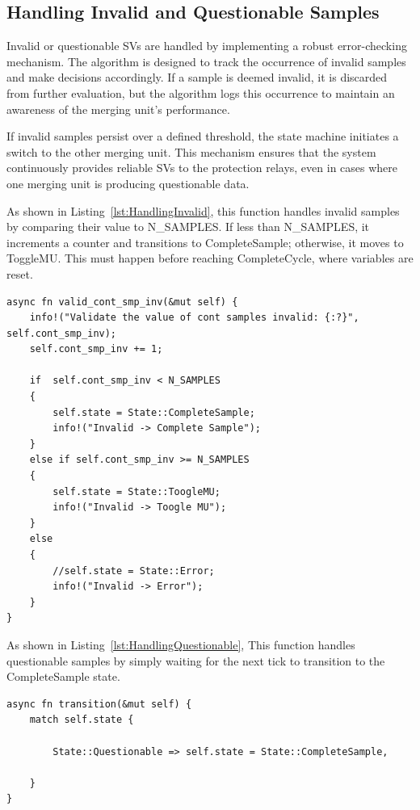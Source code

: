 \pagebreak

\subsection{Handling Invalid and Questionable Samples}
Invalid or questionable SVs are handled by implementing a robust error-checking mechanism. The algorithm is designed to track the occurrence of invalid samples and make decisions accordingly. If a sample is deemed invalid, it is discarded from further evaluation, but the algorithm logs this occurrence to maintain an awareness of the merging unit's performance.

If invalid samples persist over a defined threshold, the state machine initiates a switch to the other merging unit. This mechanism ensures that the system continuously provides reliable SVs to the protection relays, even in cases where one merging unit is producing questionable data.

As shown in Listing~\ref{lst:HandlingInvalid}, this function handles invalid samples by comparing their value to N\_SAMPLES. If less than N\_SAMPLES, it increments a counter and transitions to CompleteSample; otherwise, it moves to ToggleMU. This must happen before reaching CompleteCycle, where variables are reset.

\begin{lstlisting}[breaklines=true, caption={Function \texttt{valid\_cont\_smp\_inv()} changes state based on the frequency of invalid samples.}, label={lst:HandlingInvalid}]
async fn valid_cont_smp_inv(&mut self) {
	info!("Validate the value of cont samples invalid: {:?}", self.cont_smp_inv);
	self.cont_smp_inv += 1;
	
	if  self.cont_smp_inv < N_SAMPLES
	{
		self.state = State::CompleteSample;
		info!("Invalid -> Complete Sample");
	}
	else if self.cont_smp_inv >= N_SAMPLES 
	{
		self.state = State::ToogleMU;
		info!("Invalid -> Toogle MU");
	}
	else 
	{
		//self.state = State::Error;
		info!("Invalid -> Error");    
	}
}
\end{lstlisting}

As shown in Listing~\ref{lst:HandlingQuestionable}, This function handles questionable samples by simply waiting for the next tick to transition to the CompleteSample state.

\begin{lstlisting}[breaklines=true, caption={Function \texttt{transition()} that changes state from Questionable to CompleteSample on the next tick.}, label={lst:HandlingQuestionable}]
async fn transition(&mut self) {
	match self.state {
		
		State::Questionable => self.state = State::CompleteSample,

	}
}
\end{lstlisting}

